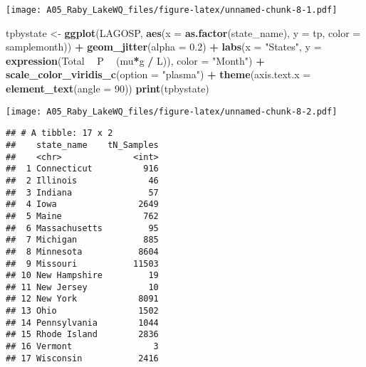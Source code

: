 \documentclass[]{article}
\newenvironment{Shaded}{\begin{snugshade}}{\end{snugshade}}
\newcommand{\DataTypeTok}[1]{\textcolor[rgb]{0.13,0.29,0.53}{#1}}
\newcommand{\DecValTok}[1]{\textcolor[rgb]{0.00,0.00,0.81}{#1}}
\newcommand{\FloatTok}[1]{\textcolor[rgb]{0.00,0.00,0.81}{#1}}
\newcommand{\KeywordTok}[1]{\textcolor[rgb]{0.13,0.29,0.53}{\textbf{#1}}}
\newcommand{\NormalTok}[1]{#1}
\newcommand{\OperatorTok}[1]{\textcolor[rgb]{0.81,0.36,0.00}{\textbf{#1}}}
\newcommand{\StringTok}[1]{\textcolor[rgb]{0.31,0.60,0.02}{#1}}
\begin{document}
\texttt{[image: A05\_Raby\_LakeWQ\_files/figure-latex/unnamed-chunk-8-1.pdf]}

\begin{Shaded}
\begin{Highlighting}[]
\NormalTok{tpbystate <-}\StringTok{ }
\KeywordTok{ggplot}\NormalTok{(LAGOSP, }
       \KeywordTok{aes}\NormalTok{(}\DataTypeTok{x =} \KeywordTok{as.factor}\NormalTok{(state_name), }\DataTypeTok{y =}\NormalTok{ tp, }\DataTypeTok{color =}\NormalTok{ samplemonth)) }\OperatorTok{+}
\StringTok{  }\KeywordTok{geom_jitter}\NormalTok{(}\DataTypeTok{alpha =} \FloatTok{0.2}\NormalTok{) }\OperatorTok{+}
\StringTok{  }\KeywordTok{labs}\NormalTok{(}\DataTypeTok{x =} \StringTok{"States"}\NormalTok{, }\DataTypeTok{y =} \KeywordTok{expression}\NormalTok{(Total }\OperatorTok{~}\StringTok{ }\NormalTok{P }\OperatorTok{~}\StringTok{ }\NormalTok{(mu}\OperatorTok{*}\NormalTok{g }\OperatorTok{/}\StringTok{ }\NormalTok{L)), }\DataTypeTok{color =} \StringTok{"Month"}\NormalTok{) }\OperatorTok{+}
\StringTok{  }\KeywordTok{scale_color_viridis_c}\NormalTok{(}\DataTypeTok{option =} \StringTok{"plasma"}\NormalTok{) }\OperatorTok{+}
\StringTok{  }\KeywordTok{theme}\NormalTok{(}\DataTypeTok{axis.text.x =} \KeywordTok{element_text}\NormalTok{(}\DataTypeTok{angle =} \DecValTok{90}\NormalTok{))}
\KeywordTok{print}\NormalTok{(tpbystate)}
\end{Highlighting}
\end{Shaded}

\texttt{[image: A05\_Raby\_LakeWQ\_files/figure-latex/unnamed-chunk-8-2.pdf]}

\begin{Shaded}
\end{Shaded}

\begin{verbatim}
## # A tibble: 17 x 2
##    state_name    tN_Samples
##    <chr>              <int>
##  1 Connecticut          916
##  2 Illinois              46
##  3 Indiana               57
##  4 Iowa                2649
##  5 Maine                762
##  6 Massachusetts         95
##  7 Michigan             885
##  8 Minnesota           8604
##  9 Missouri           11503
## 10 New Hampshire         19
## 11 New Jersey            10
## 12 New York            8091
## 13 Ohio                1502
## 14 Pennsylvania        1044
## 15 Rhode Island        2836
## 16 Vermont                3
## 17 Wisconsin           2416
\end{verbatim}
\end{document}
